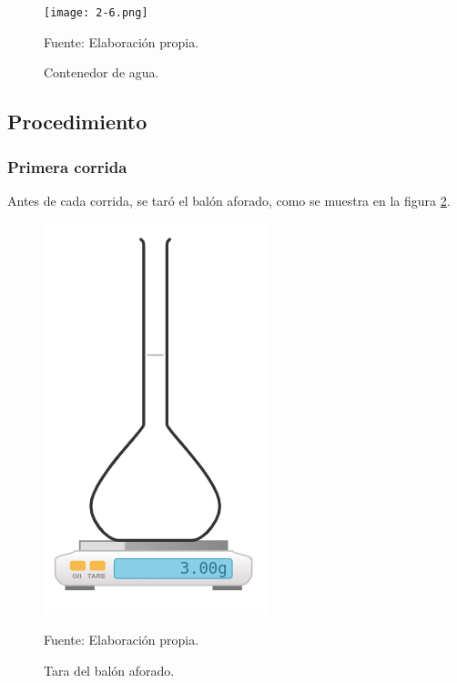 \documentclass[12pt,letterpaper]{exam}
\begin{document}
\begin{multicols}{2}
\begin{figure}[H]
\centering
\texttt{[image: 2-6.png]}
\caption{Contenedor de agua.}
\begin{center}
Fuente: Elaboración propia.
\end{center}
\label{fig:2-Contenedor}
\end{figure}


\end{multicols}

\subsection{Procedimiento}


\begin{multicols}{2}

\subsubsection{Primera corrida}

Antes de cada corrida, se taró el balón aforado, como se muestra en la figura \ref{fig:2-tara}.

\begin{figure}[H]
\centering
\includegraphics[scale=0.4]{Balón_tarado.png}
\caption{Tara del balón aforado.}
\begin{center}
Fuente: Elaboración propia.
\end{center}
\label{fig:2-tara}
\end{figure}


\end{multicols}
\end{document}
